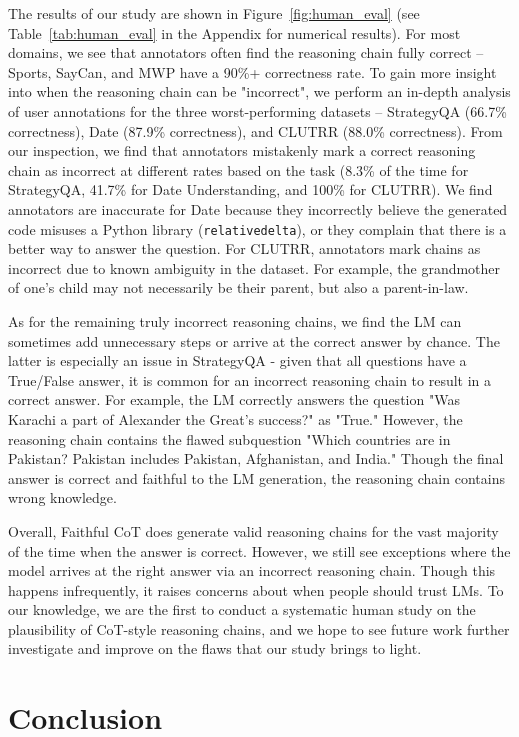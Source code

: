 \documentclass[11pt]{article}
\begin{document}
The results of our study are shown in Figure~\ref{fig:human_eval} (see Table~\ref{tab:human_eval} in the Appendix for numerical results). For most domains, we see that annotators often find the reasoning chain fully correct -- Sports, SayCan, and MWP have a 90\%+ correctness rate. To gain more insight into when the reasoning chain can be "incorrect", we perform an in-depth analysis of user annotations for the three worst-performing datasets -- StrategyQA (66.7\% correctness), Date (87.9\% correctness), and CLUTRR (88.0\% correctness). From our inspection, we find that annotators mistakenly mark a correct reasoning chain as incorrect at different rates based on the task (8.3\% of the time for StrategyQA, 41.7\% for Date Understanding, and 100\% for CLUTRR). We find annotators are inaccurate for Date because they incorrectly believe the generated code misuses a Python library (\texttt{relativedelta}), or they complain that there is a better way to answer the question. For CLUTRR, annotators mark chains as incorrect due to known ambiguity in the dataset. For example, the grandmother of one's child may not necessarily be their parent, but also a parent-in-law.

As for the remaining truly incorrect reasoning chains, we find the LM can sometimes add unnecessary steps or arrive at the correct answer by chance. The latter is especially an issue in StrategyQA - given that all questions have a True/False answer, it is common for an incorrect reasoning chain to result in a correct answer. For example, the LM correctly answers the question "Was Karachi a part of Alexander the Great's success?" as "True." However, the reasoning chain contains the flawed subquestion "Which countries are in Pakistan? Pakistan includes Pakistan, Afghanistan, and India." Though the final answer is correct and faithful to the LM generation, the reasoning chain contains wrong knowledge.

Overall, Faithful CoT does generate valid reasoning chains for the vast majority of the time when the answer is correct. However, we still see exceptions where the model arrives at the right answer via an incorrect reasoning chain. Though this happens infrequently, it raises concerns about when people should trust LMs. To our knowledge, we are the first to conduct a systematic human study on the plausibility of CoT-style reasoning chains, and we hope to see future work further investigate and improve on the flaws that our study brings to light. 


\section{Conclusion}
\end{document}
